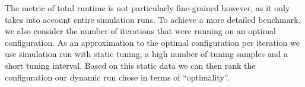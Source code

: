 The metric of total runtime is not particularly fine-grained however, as it only takes into account entire simulation runs. To achieve a more detailed benchmark, we also consider the number of iterations that were running on an optimal configuration. As an approximation to the optimal configuration per iteration we use simulation run with static tuning, a high number of tuning samples and a short tuning interval. Based on this static data we can then rank the configuration our dynamic run chose in terms of \enquote{optimality}.


